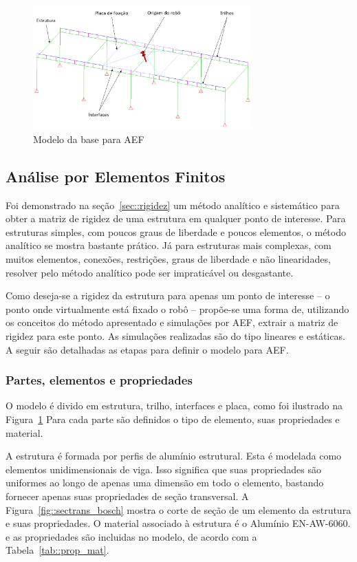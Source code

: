 \begin{figure}[h]
	\centering 
 	\includegraphics[width=0.75\textwidth]{figs/estrutFEA}
 	\caption{Modelo da base para AEF}
 	\label{fig::estrutFEA}
\end{figure}

\subsection{Análise por Elementos Finitos} \label{sec::aef}

Foi demonstrado na seção~\ref{sec::rigidez} um método analítico e sistemático
para obter a matriz de rigidez de uma estrutura em qualquer ponto de
interesse. Para estruturas simples, com poucos graus de liberdade e poucos
elementos, o método analítico se mostra bastante prático. Já para estruturas
mais complexas, com muitos elementos, conexões, restrições, graus de liberdade
e não linearidades, resolver pelo método analítico pode ser impraticável ou
desgastante.

Como deseja-se a rigidez da estrutura para apenas um ponto de interesse -- o
ponto onde virtualmente está fixado o robô -- propõe-se uma forma de, utilizando
os conceitos do método apresentado e simulações por AEF, extrair a matriz de
rigidez para este ponto. As simulações realizadas são do tipo lineares e
estáticas. A seguir são detalhadas as etapas para definir o modelo para AEF.

\subsubsection{Partes, elementos e propriedades}

O modelo é divido em estrutura, trilho, interfaces e placa, como foi ilustrado
na Figura~\ref{fig::estrutFEA} Para cada parte são definidos o tipo de elemento,
suas propriedades e material.

A estrutura é formada por perfis de alumínio estrutural. Esta é modelada como
elementos unidimensionais de viga. Isso significa que suas propriedades são
uniformes ao longo de apenas uma dimensão em todo o elemento, bastando fornecer
apenas suas propriedades de seção transversal. A
Figura~\ref{fig::sectrans_bosch} mostra o corte de seção de um elemento da
estrutura e suas propriedades. O material associado à estrutura é o Alumínio
EN-AW-6060. e as propriedades são incluidas no modelo, de acordo com a
Tabela~\ref{tab::prop_mat}.

